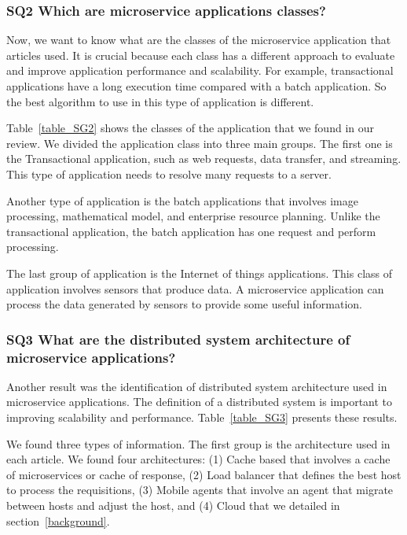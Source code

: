 \subsubsection{SQ2 Which are microservice applications classes?}

Now, we want to know what are the classes of the microservice application that articles used. It is crucial because each class has a different approach to evaluate and improve application performance and scalability. For example, transactional applications have a long execution time compared with a batch application. So the best algorithm to use in this type of application is different. 

Table~\ref{table_SG2} shows the classes of the application that we found in our review. We divided the application class into three main groups. The first one is the Transactional application, such as web requests, data transfer, and streaming. This type of application needs to resolve many requests to a server. 

Another type of application is the batch applications that involves image processing, mathematical model, and enterprise resource planning. Unlike the transactional application, the batch application has one request and perform processing.

The last group of application is the Internet of things applications. This class of application involves sensors that produce data. A microservice application can process the data generated by sensors to provide some useful information.

\subsubsection{SQ3 What are the distributed system architecture of microservice applications?}

Another result was the identification of distributed system architecture used in microservice applications. The definition of a distributed system is important to improving scalability and performance. Table~\ref{table_SG3} presents these results. 

We found three types of information. The first group is the architecture used in each article. We found four architectures: (1) Cache based that involves a cache of microservices or cache of response, (2) Load balancer that defines the best host to process the requisitions, (3) Mobile agents that involve an agent that migrate between hosts and adjust the host, and (4) Cloud that we detailed in section~\ref{background}.

